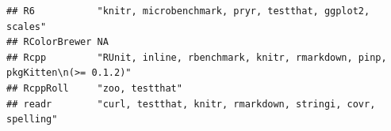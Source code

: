 \documentclass[]{article}
\begin{document}
\begin{verbatim}
## R6           "knitr, microbenchmark, pryr, testthat, ggplot2, scales"                                                                                                                                                                                                                                                                                                                                                                                                                                                                                                                                  
## RColorBrewer NA                                                                                                                                                                                                                                                                                                                                                                                                                                                                                                                                                                                        
## Rcpp         "RUnit, inline, rbenchmark, knitr, rmarkdown, pinp, pkgKitten\n(>= 0.1.2)"                                                                                                                                                                                                                                                                                                                                                                                                                                                                                                                
## RcppRoll     "zoo, testthat"                                                                                                                                                                                                                                                                                                                                                                                                                                                                                                                                                                           
## readr        "curl, testthat, knitr, rmarkdown, stringi, covr, spelling"                                                                                                                                                                                                                                                                                                                                                                                                                                                                                                                               

\end{verbatim}
\end{document}
